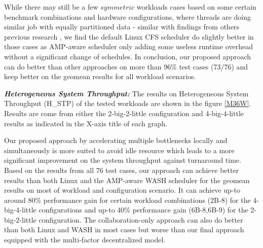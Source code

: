 \documentclass[sigplan,review,anonymous]{acmart}\settopmatter{printfolios=true,printccs=false,printacmref=false}
\begin{document}
While there may still be a few $symmetric$ workloads cases based on some certain benchmark combinations and hardware configurations, where threads are doing similar job with equally partitioned data - similar with findings from others previous research \cite{jibaja2016portable}, we find the default Linux CFS scheduler do slightly better in those cases as AMP-aware scheduler only adding some useless runtime overhead without a significant change of schedules. In conclusion, our proposed approach can do better than other approaches on more than 96\% test cases (73/76) and keep better on the geomean results for all workload scenarios.  


\textbf{\textit{Heterogeneous System Throughput:}}
The results on Heterogeneous System Throughput (H\_STP) of the tested workloads are shown in the figure \ref{M36W}.  Results are come from either the 2-big-2-little configuration and 4-big-4-little results as indicated in the X-axis title of each graph. 

Our proposed approach by accelerating multiple bottlenecks locally and simultaneously is more suited to avoid idle resource which leads to a more significant improvement on the system throughput against turnaround time. Based on the results from all 76 test cases, our approach can achieve better results than both Linux and the AMP-aware WASH scheduler for the geomean results on most of workload and configuration scenario. It can achieve up-to around 80\% performance gain for certain workload combinations (2B-8) for the 4-big-4-little configurations and up-to 40\% performance gain (6B-8,6B-9) for the 2-big-2-little configuration. 
The collaboration-only approach can also do better than both Linux and WASH in most cases but worse than our final approach equipped with the multi-factor decentralized model.

\end{document}
